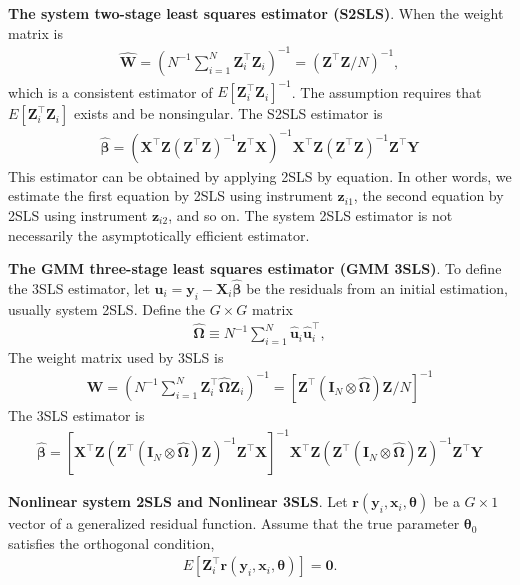 \documentclass[11pt]{article}
\numberwithin{figure}{section}
\theoremstyle{definition}
\newcommand{\0}{\mathbf{0}}
\newcommand{\bmI}{\bm{I}}
\newcommand{\bmW}{\bm{W}}
\newcommand{\bmX}{\bm{X}}
\newcommand{\bmY}{\bm{Y}}
\newcommand{\bmZ}{\bm{Z}}
\newcommand{\bmr}{\bm{r}}
\newcommand{\bmu}{\bm{u}}
\newcommand{\bmx}{\bm{x}}
\newcommand{\bmy}{\bm{y}}
\newcommand{\bmz}{\bm{z}}
\begin{document}
\textbf{The system two-stage least squares estimator (S2SLS)}. When the weight matrix is 
\begin{align*}
    \hat{\bmW} = \left(N^{-1}\sum_{i=1}^N \bmZ_i^\top \bmZ_i  \right)^{-1} = (\bmZ^\top \bmZ/N)^{-1},
\end{align*}
which is a consistent estimator of $E[\bmZ_i^\top \bmZ_i]^{-1}$. The assumption requires that $E[\bmZ_i^\top \bmZ_i]$ exists and be nonsingular.
The S2SLS estimator is 
\begin{align*}
    \hat{\bm{\beta}} = (\bmX^\top\bmZ(\bmZ^\top \bmZ)^{-1}\bmZ^\top\bmX)^{-1}\bmX^\top\bmZ(\bmZ^\top \bmZ)^{-1}\bmZ^\top\bmY
\end{align*}
This estimator can be obtained by applying 2SLS by equation. In other words, we estimate the first equation by 2SLS using instrument $\bmz_{i1}$, the second equation by 2SLS using instrument $\bmz_{i2}$, and so on.
The system 2SLS estimator is not necessarily the asymptotically efficient estimator.



\textbf{The GMM three-stage least squares estimator (GMM 3SLS)}. To define the 3SLS estimator, let $\hat{\bmu}_i = \bmy_i - \bmX_i \hat{\bm{\beta}}$  be the residuals from an initial estimation, usually system 2SLS. Define the $G\times G$ matrix
\begin{align*}
    \hat{\bm{\Omega}}\equiv N^{-1} \sum_{i=1}^N \hat{\bmu}_i\hat{\bmu}_i^\top,
\end{align*}
The weight matrix used by 3SLS is 
\begin{align*}
    \hat{\bmW} =  \left(N^{-1}\sum_{i=1}^N \bmZ_i^\top \hat{\bm{\Omega}}    \bmZ_i  \right)^{-1} = [\bmZ^\top (\bmI_N \otimes \hat{\bm{\Omega}})\bmZ/N]^{-1}
\end{align*}
The 3SLS estimator is
\begin{align*}
    \hat{\bm{\beta}} = [\bmX^\top\bmZ(\bmZ^\top (\bmI_N \otimes \hat{\bm{\Omega}})\bmZ)^{-1}\bmZ^\top\bmX]^{-1}\bmX^\top\bmZ(\bmZ^\top (\bmI_N \otimes \hat{\bm{\Omega}})\bmZ)^{-1}\bmZ^\top\bmY
\end{align*}





\textbf{Nonlinear system 2SLS and Nonlinear 3SLS}.
Let $\bmr(\bmy_i, \bmx_i, \bm{\theta})$ be a $G\times 1$ vector of a generalized residual function.
Assume that the true parameter $\bm{\theta}_0$ satisfies the orthogonal condition,
\begin{align*}
    E[\bmZ_i^\top \bmr(\bmy_i, \bmx_i, \bm{\theta})] = \bm0.
\end{align*}
\end{document}
